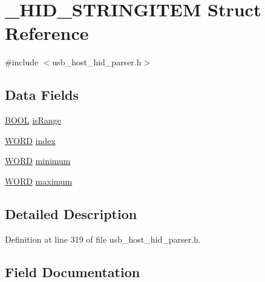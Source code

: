 \hypertarget{struct___h_i_d___s_t_r_i_n_g_i_t_e_m}{}\section{\+\_\+\+H\+I\+D\+\_\+\+S\+T\+R\+I\+N\+G\+I\+T\+E\+M Struct Reference}
\label{struct___h_i_d___s_t_r_i_n_g_i_t_e_m}


{\ttfamily \#include $<$usb\+\_\+host\+\_\+hid\+\_\+parser.\+h$>$}

\subsection*{Data Fields}
\begin{DoxyCompactItemize}
\item 
\hyperlink{_generic_type_defs_8h_a54d65c7fa62e62c9754371e42f5111b9}{B\+O\+O\+L} \hyperlink{struct___h_i_d___s_t_r_i_n_g_i_t_e_m_adeb138fd85166f4e28653db71f8223f2}{is\+Range}
\item 
\hyperlink{_generic_type_defs_8h_a2b0e863dadf920709ec53d9088ee7c91}{W\+O\+R\+D} \hyperlink{struct___h_i_d___s_t_r_i_n_g_i_t_e_m_ab7c5089b70ce76bcd61abe615ed2a42b}{index}
\item 
\hyperlink{_generic_type_defs_8h_a2b0e863dadf920709ec53d9088ee7c91}{W\+O\+R\+D} \hyperlink{struct___h_i_d___s_t_r_i_n_g_i_t_e_m_ad516b04170f6fc58ccdd8e543309848e}{minimum}
\item 
\hyperlink{_generic_type_defs_8h_a2b0e863dadf920709ec53d9088ee7c91}{W\+O\+R\+D} \hyperlink{struct___h_i_d___s_t_r_i_n_g_i_t_e_m_ac73161d67a57effa31842c273313b013}{maximum}
\end{DoxyCompactItemize}


\subsection{Detailed Description}


Definition at line 319 of file usb\+\_\+host\+\_\+hid\+\_\+parser.\+h.



\subsection{Field Documentation}
\hypertarget{struct___h_i_d___s_t_r_i_n_g_i_t_e_m_ab7c5089b70ce76bcd61abe615ed2a42b}{}
